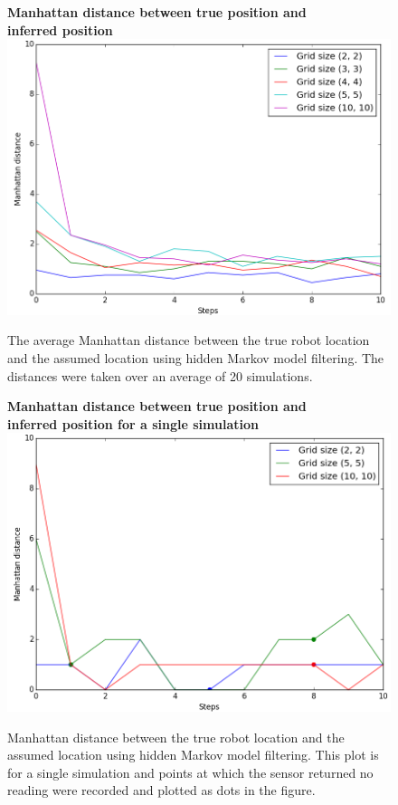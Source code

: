 \documentclass{article}
\begin{document}
\begin{figure}[h!]
    \centering
    \textbf{Manhattan distance between true position and \\ inferred position}
    \includegraphics[scale=0.45]{manhattan-errors-notitle.png}
    \caption{The average Manhattan distance between the true robot location and the assumed location using hidden Markov model filtering. The distances were taken over an average of 20 simulations.}
    \label{fig:manhattan-errors}
\end{figure}

\begin{figure}[h!]
    \centering
    \textbf{Manhattan distance between true position and \\ inferred position for a single simulation}
    \includegraphics[scale=0.45]{manhattan-errors-single.png}
    \caption{Manhattan distance between the true robot location and the assumed location using hidden Markov model filtering. This plot is for a single simulation and points at which the sensor returned no reading were recorded and plotted as dots in the figure.}
    \label{fig:manhattan-errors-single}
\end{figure}
\end{document}
